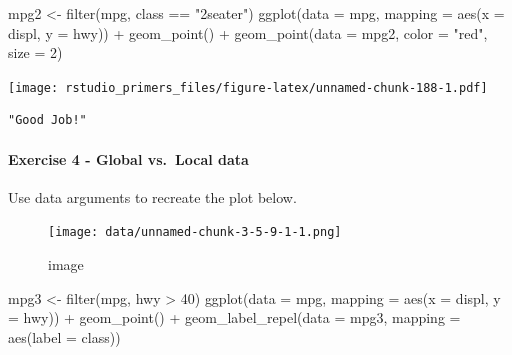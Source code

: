 \documentclass[
]{article}
\newenvironment{Shaded}{\begin{snugshade}}{\end{snugshade}}
\newcommand{\AttributeTok}[1]{\textcolor[rgb]{0.77,0.63,0.00}{#1}}
\newcommand{\DecValTok}[1]{\textcolor[rgb]{0.00,0.00,0.81}{#1}}
\newcommand{\FunctionTok}[1]{\textcolor[rgb]{0.00,0.00,0.00}{#1}}
\newcommand{\NormalTok}[1]{#1}
\newcommand{\OtherTok}[1]{\textcolor[rgb]{0.56,0.35,0.01}{#1}}
\newcommand{\SpecialCharTok}[1]{\textcolor[rgb]{0.00,0.00,0.00}{#1}}
\newcommand{\StringTok}[1]{\textcolor[rgb]{0.31,0.60,0.02}{#1}}
\begin{document}
\begin{Shaded}
\begin{Highlighting}[]
\NormalTok{mpg2 }\OtherTok{\textless{}{-}} \FunctionTok{filter}\NormalTok{(mpg, class }\SpecialCharTok{==} \StringTok{"2seater"}\NormalTok{)}
\FunctionTok{ggplot}\NormalTok{(}\AttributeTok{data =}\NormalTok{ mpg, }\AttributeTok{mapping =} \FunctionTok{aes}\NormalTok{(}\AttributeTok{x =}\NormalTok{ displ, }\AttributeTok{y =}\NormalTok{ hwy)) }\SpecialCharTok{+} 
  \FunctionTok{geom\_point}\NormalTok{() }\SpecialCharTok{+} 
  \FunctionTok{geom\_point}\NormalTok{(}\AttributeTok{data =}\NormalTok{ mpg2, }\AttributeTok{color =} \StringTok{"red"}\NormalTok{, }\AttributeTok{size =} \DecValTok{2}\NormalTok{)}
\end{Highlighting}
\end{Shaded}

\texttt{[image: rstudio\_primers\_files/figure-latex/unnamed-chunk-188-1.pdf]}

\begin{verbatim}
"Good Job!"
\end{verbatim}

\hypertarget{exercise-4---global-vs.-local-data}{%
\paragraph{Exercise 4 - Global vs.~Local
data}\label{exercise-4---global-vs.-local-data}}

Use data arguments to recreate the plot below.

\begin{figure}
\centering
\texttt{[image: data/unnamed-chunk-3-5-9-1-1.png]}
\caption{image}
\end{figure}

\begin{Shaded}
\begin{Highlighting}[]
\NormalTok{mpg3 }\OtherTok{\textless{}{-}} \FunctionTok{filter}\NormalTok{(mpg, hwy }\SpecialCharTok{\textgreater{}} \DecValTok{40}\NormalTok{)}
\FunctionTok{ggplot}\NormalTok{(}\AttributeTok{data =}\NormalTok{ mpg, }\AttributeTok{mapping =} \FunctionTok{aes}\NormalTok{(}\AttributeTok{x =}\NormalTok{ displ, }\AttributeTok{y =}\NormalTok{ hwy)) }\SpecialCharTok{+} 
  \FunctionTok{geom\_point}\NormalTok{() }\SpecialCharTok{+} 
  \FunctionTok{geom\_label\_repel}\NormalTok{(}\AttributeTok{data =}\NormalTok{ mpg3, }\AttributeTok{mapping =} \FunctionTok{aes}\NormalTok{(}\AttributeTok{label =}\NormalTok{ class))}
\end{Highlighting}
\end{Shaded}
\end{document}
